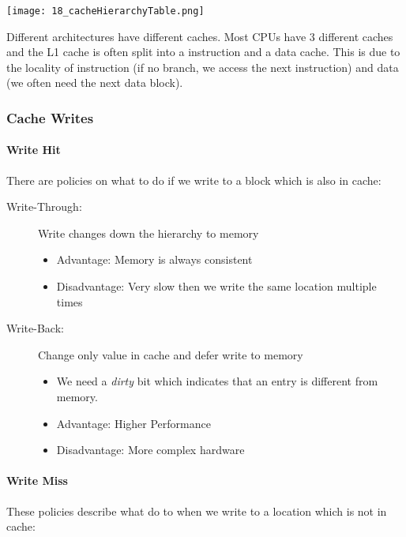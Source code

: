 \texttt{[image: 18\_cacheHierarchyTable.png]}

Different architectures have different caches. Most CPUs have $3$ different caches and the L1 cache is often split into a instruction and a data cache. This is due to the locality of instruction (if no branch, we access the next instruction) and data (we often need the next data block).

\subsubsection{Cache Writes}

\paragraph{Write Hit}
There are policies on what to do if we write to a block which is also in cache:

\begin{description}
    \item[Write-Through:] Write changes down the hierarchy to memory
        \begin{itemize}
            \item Advantage: Memory is always consistent
            \item Disadvantage: Very slow then we write the same location multiple times
        \end{itemize}
    \item[Write-Back:] Change only value in cache and defer write to memory 
        \begin{itemize}
            \item We need a \textit{dirty} bit which indicates that an entry is different from memory.
            \item Advantage: Higher Performance
            \item Disadvantage: More complex hardware
        \end{itemize}
\end{description}

\paragraph{Write Miss}
These policies describe what do to when we write to a location which is not in cache:

